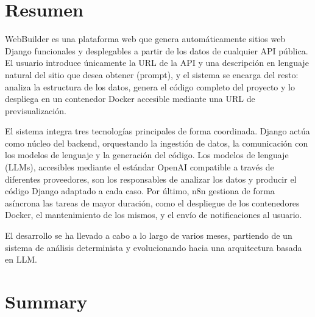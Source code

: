 
\chapter*{Resumen}

WebBuilder es una plataforma web que genera automáticamente sitios web Django funcionales y desplegables a partir de los datos de cualquier API pública. El usuario introduce únicamente la URL de la API y una descripción en lenguaje natural del sitio que desea obtener (prompt), y el sistema se encarga del resto: analiza la estructura de los datos, genera el código completo del proyecto y lo despliega en un contenedor Docker accesible mediante una URL de previsualización.

El sistema integra tres tecnologías principales de forma coordinada. Django actúa como núcleo del backend, orquestando la ingestión de datos, la comunicación con los modelos de lenguaje y la generación del código. Los modelos de lenguaje (LLMs), accesibles mediante el estándar OpenAI compatible a través de diferentes proveedores, son los responsables de analizar los datos y producir el código Django adaptado a cada caso. Por último, n8n gestiona de forma asíncrona las tareas de mayor duración, como el despliegue de los contenedores Docker, el mantenimiento de los mismos, y el envío de notificaciones al usuario.

El desarrollo se ha llevado a cabo a lo largo de varios meses, partiendo de un sistema de análisis determinista y evolucionando hacia una arquitectura basada en LLM.


\chapter*{Summary}

